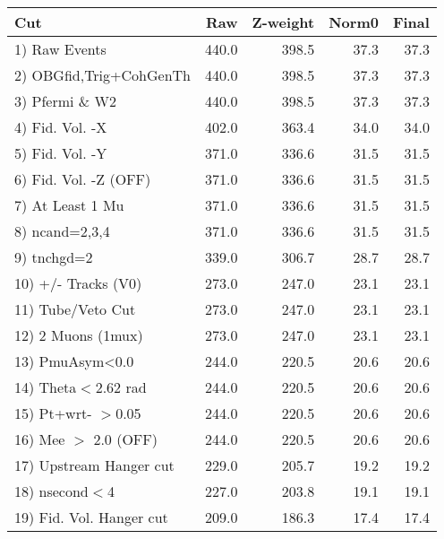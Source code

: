 \begin{table}[h!]\centering
 \begin{tabular}{||l||r|r|r|r||}
 \hline
 \hline
 Cut & Raw & Z-weight & Norm0 & Final \\
 \hline
  1) Raw Events           &       440.0 &       398.5 &        37.3 &        37.3 \\
  2) OBGfid,Trig+CohGenTh &       440.0 &       398.5 &        37.3 &        37.3 \\
  3) Pfermi \& W2         &       440.0 &       398.5 &        37.3 &        37.3 \\
  4) Fid. Vol. -X         &       402.0 &       363.4 &        34.0 &        34.0 \\
  5) Fid. Vol. -Y         &       371.0 &       336.6 &        31.5 &        31.5 \\
  6) Fid. Vol. -Z (OFF)   &       371.0 &       336.6 &        31.5 &        31.5 \\
  7) At Least 1 Mu        &       371.0 &       336.6 &        31.5 &        31.5 \\
  8) ncand=2,3,4          &       371.0 &       336.6 &        31.5 &        31.5 \\
  9) tnchgd=2             &       339.0 &       306.7 &        28.7 &        28.7 \\
 10) +/- Tracks (V0)      &       273.0 &       247.0 &        23.1 &        23.1 \\
 11) Tube/Veto Cut        &       273.0 &       247.0 &        23.1 &        23.1 \\
 12) 2 Muons (1mux)       &       273.0 &       247.0 &        23.1 &        23.1 \\
 13) PmuAsym<0.0          &       244.0 &       220.5 &        20.6 &        20.6 \\
 14) Theta$<$2.62 rad     &       244.0 &       220.5 &        20.6 &        20.6 \\
 15) Pt+wrt- $>$0.05      &       244.0 &       220.5 &        20.6 &        20.6 \\
 16) Mee $>$ 2.0  (OFF)   &       244.0 &       220.5 &        20.6 &        20.6 \\
 17) Upstream Hanger cut  &       229.0 &       205.7 &        19.2 &        19.2 \\
 18) nsecond$<$4          &       227.0 &       203.8 &        19.1 &        19.1 \\
 19) Fid. Vol. Hanger cut &       209.0 &       186.3 &        17.4 &        17.4 \\

\end{tabular}
\end{table}
